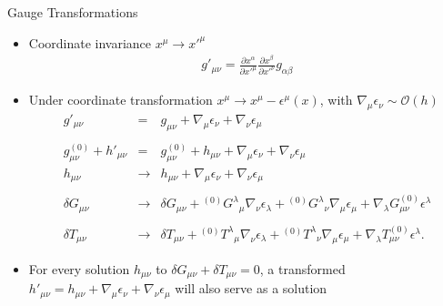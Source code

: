 \documentclass[8pt,aspectratio=1610]{beamer}
\begin{document}
\begin{frame}{Gauge Transformations}
	\begin{itemize}
		\item Coordinate invariance $x^\mu \to x'^\mu$
		\begin{eqnarray}
			g'_{\mu\nu} = \frac{\partial x^\alpha}{\partial x'^\mu}\frac{\partial x^\beta}{\partial x'^\nu}g_{\alpha\beta}
		\end{eqnarray}
		\item 	Under coordinate transformation $x^\mu \to x^\mu - \epsilon^\mu(x)$, with $\nabla_\mu \epsilon_\nu \sim \mathcal O(h)$
			\begin{eqnarray}
				g'_{\mu\nu} &=& g_{\mu\nu} + \nabla_\mu \epsilon_\nu + \nabla_\nu \epsilon_\mu
				\\ \nonumber\\
				g^{(0)}_{\mu\nu} + h'_{\mu\nu} &=& g^{(0)}_{\mu\nu} + h_{\mu\nu} + \nabla_\mu \epsilon_\nu + \nabla_\nu \epsilon_\mu
				\\
				h_{\mu\nu} &\to& h_{\mu\nu} + \nabla_\mu \epsilon_\nu + \nabla_\nu \epsilon_\mu
				\\ \nonumber\\
				\delta G_{\mu\nu} &\to& \delta G_{\mu\nu} + {}^{(0)}G^\lambda{}_\mu \nabla_\nu \epsilon_\lambda +  {}^{(0)}G^{\lambda}{}_{\nu}\nabla_\mu \epsilon_\mu + \nabla_\lambda  G^{(0)}_{\mu\nu} \epsilon^\lambda
				\\ \nonumber\\
				\delta T_{\mu\nu} &\to& \delta T_{\mu\nu} + {}^{(0)}T^\lambda{}_\mu \nabla_\nu \epsilon_\lambda +  {}^{(0)}T^{\lambda}{}_{\nu}\nabla_\mu \epsilon_\mu + \nabla_\lambda  T^{(0)}_{\mu\nu} \epsilon^\lambda.
			\end{eqnarray}
		\item 	For every solution $h_{\mu\nu}$ to $\delta G_{\mu\nu} + \delta T_{\mu\nu} = 0$, a transformed $h'_{\mu\nu} = h_{\mu\nu} + \nabla_\mu \epsilon_\nu + \nabla_\nu \epsilon_\mu$ will also serve as a solution
	\end{itemize}


\end{frame}
\end{document}
